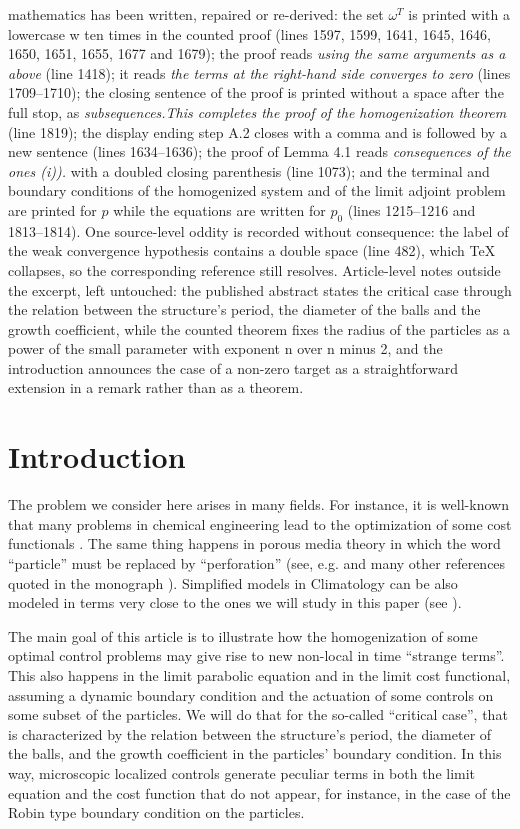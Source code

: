 \documentclass[10pt,a4paper]{amsart}
\numberwithin{equation}{section}
\begin{document}
mathematics has been written, repaired or re-derived: the set $\omega^{T}$ is printed with a lowercase w ten times in the counted proof (lines 1597, 1599, 1641, 1645, 1646, 1650, 1651, 1655, 1677 and 1679); the proof reads \emph{using the same arguments as a above} (line 1418); it reads \emph{the terms at the right-hand side converges to zero} (lines 1709--1710); the closing sentence of the proof is printed without a space after the full stop, as \emph{subsequences.This completes the proof of the homogenization theorem} (line 1819); the display ending step A.2 closes with a comma and is followed by a new sentence (lines 1634--1636); the proof of Lemma 4.1 reads \emph{consequences of the ones (i)).} with a doubled closing parenthesis (line 1073); and the terminal and boundary conditions of the homogenized system and of the limit adjoint problem are printed for $p$ while the equations are written for $p_0$ (lines 1215--1216 and 1813--1814). One source-level oddity is recorded without consequence: the label of the weak convergence hypothesis contains a double space (line 482), which TeX collapses, so the corresponding reference still resolves. Article-level notes outside the excerpt, left untouched: the published abstract states the critical case through the relation between the structure's period, the diameter of the balls and the growth coefficient, while the counted theorem fixes the radius of the particles as a power of the small parameter with exponent n over n minus 2, and the introduction announces the case of a non-zero target as a straightforward extension in a remark rather than as a theorem.
\section{Introduction}

The problem we consider here arises in many fields. For instance,
it is well-known that many problems in chemical engineering lead to the
optimization of some cost functionals
\cite{Nolasco-Survey, Upreti book}. The same thing happens in
porous media theory in which the word ``particle''  must be replaced by
``perforation''  (see, e.g.
\cite{ Anguiano, ConcaDliTi,  GoSanchezP, Hornung-Yaeger, Hurlov,  
Iliev-Mikelik, OlSh95, Timof} and many other
references quoted in the monograph \cite{DiGoShBook}).
Simplified models in Climatology can be also modeled in terms very close to the
ones we will study in this paper (see \cite{DiPoShRACSAM}).

The main goal of this article is to illustrate how the homogenization of some
optimal control problems may give rise to new non-local in time ``strange
terms''. This also happens in the limit parabolic equation and in the limit
cost functional, assuming a dynamic boundary condition and the actuation of some
controls on some subset of the particles.
We will do that for the so-called
``critical case'', that is characterized
by the relation between the structure's period, the diameter of the
balls, and the growth coefficient in the particles' boundary condition.
In this way, microscopic localized controls generate peculiar terms in both
the limit equation and the cost function that do not appear, for instance, in
the case of the Robin type boundary condition on the particles.
\end{document}
